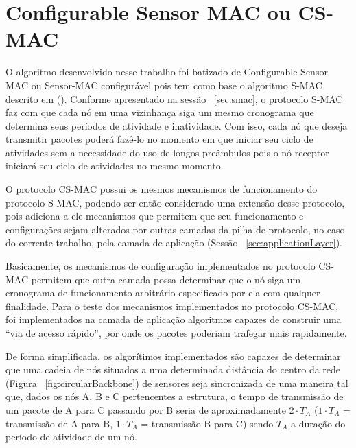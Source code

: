 \section{Configurable Sensor MAC ou CS-MAC}

O algoritmo desenvolvido nesse trabalho foi batizado de Configurable Sensor MAC ou Sensor-MAC configurável pois tem como base o algoritmo S-MAC descrito em  (\citeyear{ye04}). Conforme apresentado na sessão ~\ref{sec:smac}, o protocolo S-MAC faz com que cada nó em uma vizinhança siga um mesmo cronograma que determina seus períodos de atividade e inatividade. Com isso, cada nó que deseja transmitir pacotes poderá fazê-lo no momento em que iniciar seu ciclo de atividades sem a necessidade do uso de longos preâmbulos pois o nó receptor iniciará seu ciclo de atividades no mesmo momento.

O protocolo CS-MAC possui os mesmos mecanismos de funcionamento do protocolo S-MAC, podendo ser então considerado uma extensão desse protocolo, pois adiciona a ele mecanismos que permitem que seu funcionamento e configurações sejam alterados por outras camadas da pilha de protocolo, no caso do corrente trabalho, pela camada de aplicação (Sessão ~\ref{sec:applicationLayer}). 

Basicamente, os mecanismos de configuração implementados no protocolo CS-MAC permitem que outra camada possa determinar que o nó siga um cronograma de funcionamento arbitrário especificado por ela com qualquer finalidade. Para o teste dos mecanismos implementados no protocolo CS-MAC, foi implementados na camada de aplicação algoritmos capazes de construir uma ``via de acesso rápido'', por onde os pacotes poderiam trafegar mais rapidamente.

De forma simplificada, os algorítimos implementados são capazes de determinar que uma cadeia de nós situados a uma determinada distância do centro da rede (Figura ~\ref{fig:circularBackbone}) de sensores seja sincronizada de uma maneira tal que, dados os nós A, B e C pertencentes a estrutura, o tempo de transmissão de um pacote de A para C passando por B seria de aproximadamente $2 \cdot T_A$  ($1 \cdot T_A$ = transmissão de A para B, $1 \cdot T_A$ = transmissão B para C) sendo $T_A$ a duração do período de atividade de um nó. 

